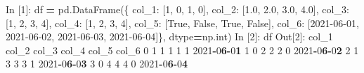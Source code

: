 \documentclass[
]{book}
\newenvironment{Shaded}{\begin{snugshade}}{\end{snugshade}}
\newcommand{\BuiltInTok}[1]{#1}
\newcommand{\DecValTok}[1]{\textcolor[rgb]{0.00,0.00,0.81}{#1}}
\newcommand{\ErrorTok}[1]{\textcolor[rgb]{0.64,0.00,0.00}{\textbf{#1}}}
\newcommand{\FloatTok}[1]{\textcolor[rgb]{0.00,0.00,0.81}{#1}}
\newcommand{\NormalTok}[1]{#1}
\newcommand{\OperatorTok}[1]{\textcolor[rgb]{0.81,0.36,0.00}{\textbf{#1}}}
\newcommand{\StringTok}[1]{\textcolor[rgb]{0.31,0.60,0.02}{#1}}
\newcommand{\VariableTok}[1]{\textcolor[rgb]{0.00,0.00,0.00}{#1}}
\begin{document}
\begin{Shaded}
\begin{Highlighting}[]
\NormalTok{In [}\DecValTok{1}\NormalTok{]: df }\OperatorTok{=}\NormalTok{ pd.DataFrame(\{}
                   \StringTok{\textquotesingle{}col\_1\textquotesingle{}}\NormalTok{: [}\DecValTok{1}\NormalTok{, }\DecValTok{0}\NormalTok{, }\DecValTok{1}\NormalTok{, }\DecValTok{0}\NormalTok{], }
                   \StringTok{\textquotesingle{}col\_2\textquotesingle{}}\NormalTok{: [}\FloatTok{1.0}\NormalTok{, }\FloatTok{2.0}\NormalTok{, }\FloatTok{3.0}\NormalTok{, }\FloatTok{4.0}\NormalTok{], }
                   \StringTok{\textquotesingle{}col\_3\textquotesingle{}}\NormalTok{: [}\StringTok{\textquotesingle{}1\textquotesingle{}}\NormalTok{, }\StringTok{\textquotesingle{}2\textquotesingle{}}\NormalTok{, }\StringTok{\textquotesingle{}3\textquotesingle{}}\NormalTok{, }\StringTok{\textquotesingle{}4\textquotesingle{}}\NormalTok{],}
                   \StringTok{\textquotesingle{}col\_4\textquotesingle{}}\NormalTok{: [}\StringTok{\textquotesingle{}1\textquotesingle{}}\NormalTok{, }\DecValTok{2}\NormalTok{, }\StringTok{\textquotesingle{}3\textquotesingle{}}\NormalTok{, }\DecValTok{4}\NormalTok{],}
                   \StringTok{\textquotesingle{}col\_5\textquotesingle{}}\NormalTok{: [}\VariableTok{True}\NormalTok{, }\VariableTok{False}\NormalTok{, }\VariableTok{True}\NormalTok{, }\VariableTok{False}\NormalTok{],}
                   \StringTok{\textquotesingle{}col\_6\textquotesingle{}}\NormalTok{: [}\StringTok{\textquotesingle{}2021{-}06{-}01\textquotesingle{}}\NormalTok{, }\StringTok{\textquotesingle{}2021{-}06{-}02\textquotesingle{}}\NormalTok{, }\StringTok{\textquotesingle{}2021{-}06{-}03\textquotesingle{}}\NormalTok{, }\StringTok{\textquotesingle{}2021{-}06{-}04\textquotesingle{}}\NormalTok{]\},}
\NormalTok{                   dtype}\OperatorTok{=}\NormalTok{np.}\BuiltInTok{int}\NormalTok{)}
\NormalTok{In [}\DecValTok{2}\NormalTok{]: df}
\NormalTok{Out[}\DecValTok{2}\NormalTok{]:}
\NormalTok{   col\_1  col\_2  col\_3  col\_4  col\_5       col\_6}
\DecValTok{0}      \DecValTok{1}      \DecValTok{1}      \DecValTok{1}      \DecValTok{1}      \DecValTok{1}  \DecValTok{2021}\OperatorTok{{-}}\DecValTok{0}\ErrorTok{6}\OperatorTok{{-}}\DecValTok{0}\ErrorTok{1}
\DecValTok{1}      \DecValTok{0}      \DecValTok{2}      \DecValTok{2}      \DecValTok{2}      \DecValTok{0}  \DecValTok{2021}\OperatorTok{{-}}\DecValTok{0}\ErrorTok{6}\OperatorTok{{-}}\DecValTok{0}\ErrorTok{2}
\DecValTok{2}      \DecValTok{1}      \DecValTok{3}      \DecValTok{3}      \DecValTok{3}      \DecValTok{1}  \DecValTok{2021}\OperatorTok{{-}}\DecValTok{0}\ErrorTok{6}\OperatorTok{{-}}\DecValTok{0}\ErrorTok{3}
\DecValTok{3}      \DecValTok{0}      \DecValTok{4}      \DecValTok{4}      \DecValTok{4}      \DecValTok{0}  \DecValTok{2021}\OperatorTok{{-}}\DecValTok{0}\ErrorTok{6}\OperatorTok{{-}}\DecValTok{0}\ErrorTok{4}


\end{Highlighting}
\end{Shaded}
\end{document}
